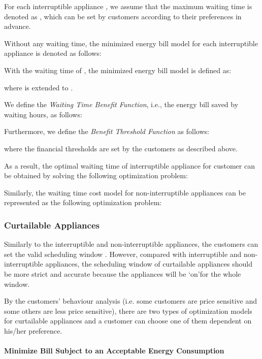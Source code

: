 \documentclass[10pt,journal]{IEEEtran}
\theoremstyle{definition}
\theoremstyle{plain} \newtheorem{theo}{Theorem} \newtheorem{prop}{Proposition}  \newtheorem{lemm}{Lemma}
\begin{document}
For each interruptible appliance , we assume that the maximum waiting time is denoted as , which can be set by customers according to their preferences in advance.

Without any waiting time, the minimized energy bill model for each interruptible appliance is denoted as follows:



With the waiting time of  , the minimized energy bill model is defined as:
 
where  is extended to .

We define the \textit{Waiting Time Benefit Function}, i.e., the energy bill saved by waiting  hours, as follows:


Furthermore, we define the \textit{Benefit Threshold Function} as follows: 

where the financial thresholds  are set by the customers as described above. 

As a result, the optimal waiting time of interruptible appliance  for customer  can be obtained by solving the following optimization problem: 
\vspace{-0.4cm}

Similarly, the waiting time cost model for non-interruptible appliances can be represented as the following optimization problem:
\vspace{-0.35cm}


\subsubsection{Curtailable Appliances}
Similarly to the interruptible and non-interruptible appliances, the customers can set the valid scheduling window .  However, compared with interruptible and non-interruptible appliances, the scheduling window of curtailable appliances should be more strict and accurate because the appliances will be \lq on\rq \text{ }for the whole window.



By the customers' behaviour analysis (i.e. some customers are price sensitive and some others are less price sensitive), there are two types of optimization models for curtailable appliances and a customer can choose one of them dependent on his/her preference.






\paragraph{Minimize Bill Subject to an Acceptable Energy Consumption}
\end{document}

